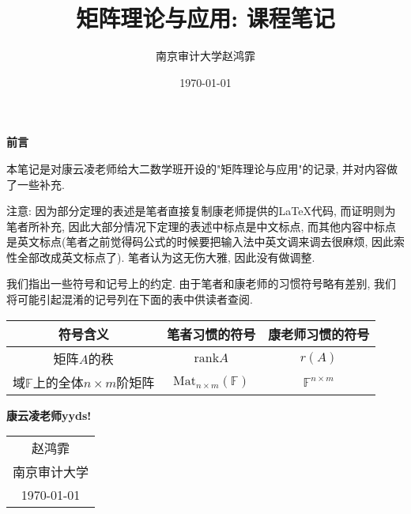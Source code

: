 \documentclass{article}
\title{\textbf{矩阵理论与应用: 课程笔记}}
\author{南京审计大学\hspace{0.5cm}赵鸿霏}
\date{\today}
\begin{document}
\maketitle
\tableofcontents
\newpage
\begin{center}
\begin{huge}
     \textbf{前言}
\end{huge}
\end{center}
本笔记是对康云凌老师给大二数学班开设的"矩阵理论与应用"的记录, 并对内容做了一些补充.\par
注意: 因为部分定理的表述是笔者直接复制康老师提供的LaTeX代码, 而证明则为笔者所补充, 因此大部分情况下定理的表述中标点是中文标点, 而其他内容中标点是英文标点(笔者之前觉得码公式的时候要把输入法中英文调来调去很麻烦, 因此索性全部改成英文标点了). 笔者认为这无伤大雅, 因此没有做调整.\par
我们指出一些符号和记号上的约定. 由于笔者和康老师的习惯符号略有差别, 我们将可能引起混淆的记号列在下面的表中供读者查阅.
\begin{table}[htbp]
    \centering
    \begin{tabular}{|c|c|c|}
        \toprule
        符号含义 & 笔者习惯的符号 & 康老师习惯的符号 \\
        \midrule
        矩阵$A$的秩 & $\mathrm{rank}A$ & $r(A)$ \\
        域$\mathbb{F}$上的全体$n\times m$阶矩阵 & $\mathrm{Mat}_{n\times m}(\mathbb{F})$ & $\mathbb{F}^{n\times m}$ \\
        \bottomrule
    \end{tabular}
\end{table}\par
\textbf{康云凌老师yyds!}
\begin{flushright}
    \begin{tabular}{c}
        赵鸿霏\\
        南京审计大学\\
        \today
    \end{tabular}
\end{flushright}
\newpage

\newpage

\newpage
\printbibliography
\end{document}
